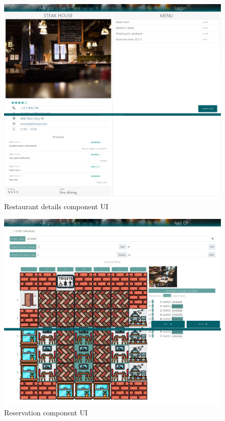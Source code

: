 \begin{figure}[ht]
	\centering
	\includegraphics[width=150mm, keepaspectratio]{figures/UI/2_RestaurantDetails}
	\caption{Restaurant details component UI} 
	\label{fig:UI_2}
\end{figure}

\begin{figure}[ht]
	\centering
	\includegraphics[width=150mm, keepaspectratio]{figures/UI/4_Reservation}
	\caption{Reservation component UI} 
	\label{fig:UI_4}
\end{figure}

